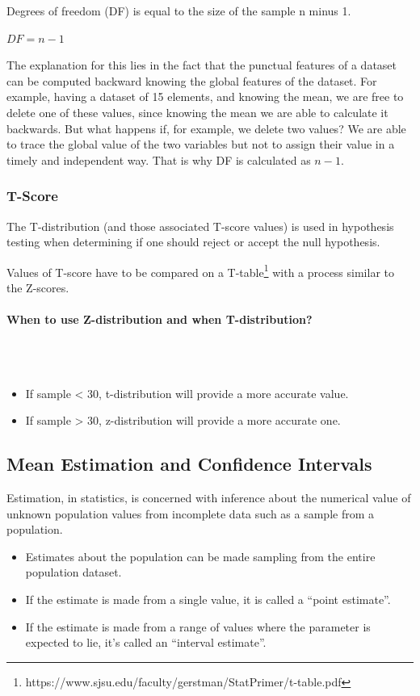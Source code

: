 \documentclass{article}
\begin{document}
Degrees of freedom (DF) is equal to the size of the sample n minus 1.

$DF = n - 1$

The explanation for this lies in the fact that the punctual features of a dataset can be computed backward knowing the global features of the dataset.
For example, having a dataset of 15 elements, and knowing the mean, we are free to delete one of these values, since knowing the mean we are able to calculate it backwards.
But what happens if, for example, we delete two values? We are able to trace the global value of the two variables but not to assign their value in a timely and independent way.
That is why DF is calculated as $n - 1$.

\subsubsection{T-Score}
The T-distribution (and those associated T-score values) is used in hypothesis testing
 when determining if one should reject or accept the null hypothesis.

Values of T-score have to be compared on a T-table\footnote{https://www.sjsu.edu/faculty/gerstman/StatPrimer/t-table.pdf} with a process similar to the Z-scores.

\paragraph{When to use Z-distribution and when T-distribution?}\mbox{} \\
\mbox{} \\
\begin{itemize}
    \item If sample < 30, t-distribution will provide a more accurate value.
    \item If sample > 30, z-distribution will provide a more accurate one.
\end{itemize}

\subsection{Mean Estimation and Confidence Intervals}
 Estimation, in statistics, is concerned with inference about the numerical value of unknown population values from incomplete data such as a sample from a population.

\begin{itemize}
    \item Estimates about the population can be made sampling from the entire population dataset.
    \item If the estimate is made from a single value, it is called a “point estimate”.
    \item If the estimate is made from a range of values where the parameter is expected to lie, it’s called an “interval estimate”.
\end{itemize} 
\end{document}
